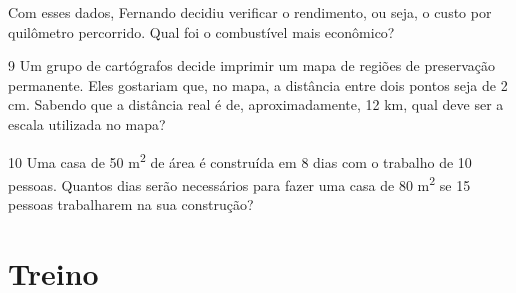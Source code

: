 Com esses dados, Fernando decidiu verificar o rendimento, ou seja, o custo 
por quilômetro percorrido. Qual foi o combustível mais econômico?

\begin{emptybox}
\end{emptybox}

\pagebreak
\num{9} Um grupo de cartógrafos decide imprimir um mapa de regiões de
preservação permanente. Eles gostariam que, no mapa, a distância entre
dois pontos seja de 2 cm. Sabendo que a distância real é de,
aproximadamente, 12 km, qual deve ser a escala utilizada no mapa?

\begin{emptybox}
\vspace{4cm}
\end{emptybox}

\num{10} Uma casa de 50 m\textsuperscript{2} de área é construída em 8 dias 
com o trabalho de 10 pessoas. Quantos dias serão necessários para fazer uma 
casa de 80 m\textsuperscript{2} se 15 pessoas trabalharem na sua construção?

\begin{emptybox}
\vspace{3cm}
\end{emptybox}

\pagebreak
\section*{Treino}

